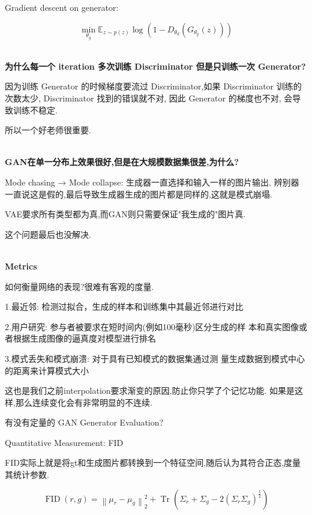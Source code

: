 	Gradient descent on generator:

	\begin{equation}
	\min_{\theta_g}\mathbb{E}_{z\sim p(z)}\log(1-D_{\theta_d}(G_{\theta_g}(z)))	
	\end{equation}

	\textbf{\\为什么每一个 iteration 多次训练 Discriminator 但是只训练一次 Generator?}

	因为训练 Generator 的时候梯度要流过 Discriminator,如果 Discriminator 训练的次数太少,
	Discriminator 找到的错误就不对, 因此 Generator 的梯度也不对, 会导致训练不稳定.

	所以一个好老师很重要.

	\textbf{\\GAN在单一分布上效果很好,但是在大规模数据集很差,为什么?}

	Mode chasing → Mode collapse: 生成器一直选择和输入一样的图片输出,
	辨别器一直说这是假的,最后导致生成器生成的图片都是同样的,这就是模式崩塌.

	VAE要求所有类型都为真,而GAN则只需要保证"我生成的"图片真.
	
	这个问题最后也没解决.

	\textbf{\\Metrics}

	如何衡量网络的表现?很难有客观的度量.
	
	1.最近邻: 检测过拟合，生成的样本和训练集中其最近邻进行对比

	2.用户研究: 参与者被要求在短时间内(例如100毫秒)区分生成的样
	本和真实图像或者根据生成图像的逼真度对模型进行排名 

	3.模式丢失和模式崩溃: 对于具有已知模式的数据集通过测
	量生成数据到模式中心的距离来计算模式大小
	
	这也是我们之前interpolation要求渐变的原因,防止你只学了个记忆功能.
	如果是这样,那么连续变化会有非常明显的不连续.
	
	有没有定量的 GAN Generator Evaluation?

	Quantitative Measurement: FID
	
	FID实际上就是将gt和生成图片都转换到一个特征空间,随后认为其符合正态,度量其统计参数.
	
	\begin{equation}
		\operatorname{FID}(r, g)=\left\|\mu_{r}-\mu_{g}\right\|_{2}^{2}+\operatorname{Tr}\left(\Sigma_{r}+\Sigma_{g}-2\left(\Sigma_{r} \Sigma_{g}\right)^{\frac{1}{2}}\right)
	\end{equation}

